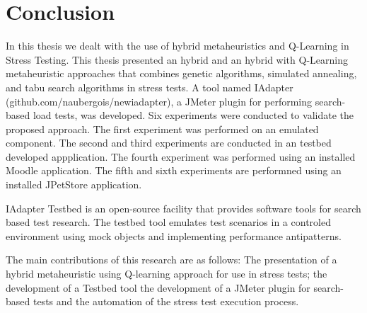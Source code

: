\documentclass{report}
\begin{document}









%
%
%
\chapter{Conclusion}

In this thesis we dealt with the use of hybrid metaheuristics and Q-Learning in Stress Testing. This thesis presented an hybrid and an hybrid with Q-Learning metaheuristic approaches that combines genetic algorithms, simulated annealing, and tabu search algorithms in stress tests. A tool named IAdapter (github.com/naubergois/newiadapter), a JMeter plugin for performing search-based load tests, was developed. Six experiments were conducted to validate the proposed approach. The first experiment was performed on an emulated component. The second and third experiments are conducted in an testbed developed appplication. The fourth  experiment was performed using an installed Moodle application. The fifth and sixth experiments are performned using an installed JPetStore application.

IAdapter Testbed is an open-source facility that provides software tools for search based test research. The testbed tool emulates test scenarios in a controled environment using mock objects and implementing performance antipatterns.

The main contributions of this research are as follows: The presentation of a hybrid metaheuristic using Q-learning  approach for use in stress tests; the development of a Testbed tool the development of a JMeter plugin  for search-based tests and  the automation of the stress test execution process.  
\end{document}
